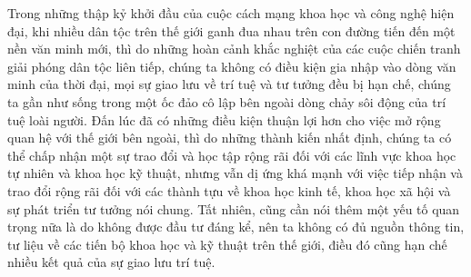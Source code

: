 Trong những thập kỷ khởi đầu của cuộc cách mạng khoa học và công nghệ hiện đại, khi nhiều dân tộc trên thế giới ganh đua nhau trên con đường tiến đến một nền văn minh mới, thì do những hoàn cảnh khắc nghiệt của các cuộc chiến tranh giải phóng dân tộc liên tiếp, chúng ta không có điều kiện gia nhập vào dòng văn minh của thời đại, mọi sự giao lưu về trí tuệ và tư tưởng đều bị hạn chế, chúng ta gần như sống trong một ốc đảo cô lập bên ngoài dòng chảy sôi động của trí tuệ loài người. Đấn lúc đã có những điều kiện thuận lợi hơn cho việc mở rộng quan hệ với thế giới bên ngoài, thì do những thành kiến nhất định, chúng ta có thể chấp nhận một sự trao đổi và học tập rộng rãi đối với các lĩnh vực khoa học tự nhiên và khoa học kỹ thuật, nhưng vẫn dị ứng khá mạnh với việc tiếp nhận và trao đổi rộng rãi đối với các thành tựu về khoa học kinh tế, khoa học xã hội và sự phát triển tư tưởng nói chung. Tất nhiên, cũng cần nói thêm một yếu tố quan trọng nữa là do không được đầu tư đáng kể, nên ta không có đủ nguồn thông tin, tư liệu về các tiến bộ khoa học và kỹ thuật trên thế giới, điều đó cũng hạn chế nhiều kết quả của sự giao lưu trí tuệ.

